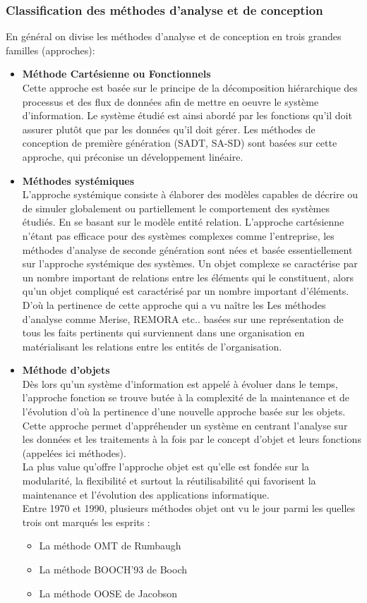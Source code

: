 \documentclass[a4paper, 12pt]{report}
\begin{document}
\subsubsection{Classification des méthodes d'analyse et de conception}
En général on divise les méthodes d'analyse et de conception en trois grandes familles (approches):

\begin{itemize}
  \item \textbf{Méthode Cartésienne ou Fonctionnels} \\ 
  Cette approche est basée sur le principe de la décomposition hiérarchique des processus et des flux de données afin de mettre en oeuvre le système d'information. Le système étudié est ainsi abordé par les fonctions qu'il doit assurer plutôt que par les données qu'il doit gérer. Les méthodes de conception de première génération (SADT, SA-SD) sont basées sur cette approche, qui préconise un développement linéaire.
  \item \textbf{Méthodes systémiques} \\
  L'approche systémique consiste à élaborer des modèles capables de décrire ou de simuler globalement ou partiellement le comportement des systèmes étudiés. En se basant sur le modèle entité relation. L'approche cartésienne n'étant pas efficace pour des systèmes complexes comme l'entreprise, les méthodes d'analyse de seconde génération sont nées et basée essentiellement sur l'approche systémique des systèmes. Un objet complexe se caractérise par un nombre important de relations entre les éléments qui le constituent, alors qu'un objet compliqué est caractérisé par un nombre important d'éléments. D'où la pertinence de cette approche qui a vu naître les Les méthodes d'analyse comme Merise, REMORA etc.. basées sur une représentation de tous les faits pertinents qui surviennent dans une organisation en matérialisant les relations entre les entités de l'organisation.
  \item \textbf{Méthode d’objets} \\
  Dès lors qu'un système d'information est appelé à évoluer dans le temps, l'approche fonction se trouve butée à la complexité de la maintenance et de l'évolution d'où la pertinence d'une nouvelle approche basée sur les objets. Cette approche permet d'appréhender un système en centrant l'analyse sur les données et les traitements à la fois par le concept d'objet et leurs fonctions (appelées ici méthodes). \\
  La plus value qu'offre l'approche objet est qu'elle est fondée sur la modularité, la flexibilité et surtout la réutilisabilité qui favorisent la maintenance et l'évolution des applications informatique.\\
  Entre 1970 et 1990, plusieurs méthodes objet ont vu le jour parmi les quelles trois ont marqués les esprits : 
  \begin{itemize}
    \item La méthode OMT de Rumbaugh
    \item La méthode BOOCH'93 de Booch
    \item La méthode OOSE de Jacobson 
  \end{itemize}
\end{itemize}
\end{document}
